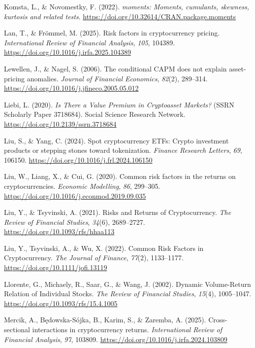 \documentclass[
  12pt,
  a4paper,
  openany]{scrbook}
\newlength{\cslhangindent}
\newenvironment{CSLReferences}[2] %
 {\begin{list}{}{%
  \setlength{\itemindent}{0pt}
  \setlength{\leftmargin}{0pt}
  \setlength{\parsep}{0pt}
  \ifodd #1
   \setlength{\leftmargin}{\cslhangindent}
   \setlength{\itemindent}{-1\cslhangindent}
  \fi
  \setlength{\itemsep}{#2\baselineskip}}}
 {\end{list}}
\begin{document}
\begin{CSLReferences}{1}{0}
Komsta, L., \& Novomestky, F. (2022). \emph{{moments}: Moments,
cumulants, skewness, kurtosis and related tests}.
\url{https://doi.org/10.32614/CRAN.package.moments}

Lan, T., \& Frömmel, M. (2025). Risk factors in cryptocurrency pricing.
\emph{International Review of Financial Analysis}, \emph{105}, 104389.
\url{https://doi.org/10.1016/j.irfa.2025.104389}

Lewellen, J., \& Nagel, S. (2006). The conditional CAPM does not explain
asset-pricing anomalies. \emph{Journal of Financial Economics},
\emph{82}(2), 289--314.
\url{https://doi.org/10.1016/j.jfineco.2005.05.012}

Liebi, L. (2020). \emph{Is There a Value Premium in Cryptoasset
Markets?} (SSRN Scholarly Paper 3718684). Social Science Research
Network. \url{https://doi.org/10.2139/ssrn.3718684}

Liu, S., \& Yang, C. (2024). Spot cryptocurrency ETFs: Crypto investment
products or stepping stones toward tokenization. \emph{Finance Research
Letters}, \emph{69}, 106150.
\url{https://doi.org/10.1016/j.frl.2024.106150}

Liu, W., Liang, X., \& Cui, G. (2020). Common risk factors in the
returns on cryptocurrencies. \emph{Economic Modelling}, \emph{86},
299--305. \url{https://doi.org/10.1016/j.econmod.2019.09.035}

Liu, Y., \& Tsyvinski, A. (2021). Risks and Returns of Cryptocurrency.
\emph{The Review of Financial Studies}, \emph{34}(6), 2689--2727.
\url{https://doi.org/10.1093/rfs/hhaa113}

Liu, Y., Tsyvinski, A., \& Wu, X. (2022). Common Risk Factors in
Cryptocurrency. \emph{The Journal of Finance}, \emph{77}(2), 1133--1177.
\url{https://doi.org/10.1111/jofi.13119}

Llorente, G., Michaely, R., Saar, G., \& Wang, J. (2002). Dynamic
Volume-Return Relation of Individual Stocks. \emph{The Review of
Financial Studies}, \emph{15}(4), 1005--1047.
\url{https://doi.org/10.1093/rfs/15.4.1005}

Mercik, A., Będowska-Sójka, B., Karim, S., \& Zaremba, A. (2025).
Cross-sectional interactions in cryptocurrency returns.
\emph{International Review of Financial Analysis}, \emph{97}, 103809.
\url{https://doi.org/10.1016/j.irfa.2024.103809}


\end{CSLReferences}
\end{document}
